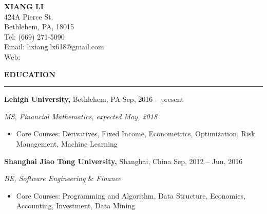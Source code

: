 \documentclass[a4paper,12pt]{report}
\newcommand{\marginAdj}{0.5in}
\begin{document}
\sloppy
{\centering
 \fontsize{12pt}{12pt}\selectfont\textbf{XIANG LI}\\
 \fontsize{11pt}{11pt}\selectfont 424A Pierce St. \\
 \fontsize{11pt}{11pt}\selectfont Bethlehem, PA, 18015 \\
 \fontsize{11pt}{11pt}\selectfont Tel: (669) 271-5090 \\
 \fontsize{11pt}{11pt}\selectfont Email: lixiang.lx618@gmail.com \\
 \fontsize{11pt}{11pt}\selectfont Web: \href{https://github.com/LiXiang618}{} \\
}

\vspace{9pt}



\noindent 
\textbf{EDUCATION} \par
\vspace{2pt}
\hrule
\vspace{6pt}
\noindent 
\textbf{Lehigh University, }Bethlehem, PA{\fontsize{9pt}{9pt}\selectfont \textbf{ \hspace*{3.25in} \hspace*{\marginAdj} }{\fontsize{10pt}{10pt}\selectfont Sep, 2016 – present}} \par
\noindent 
{\fontsize{10pt}{10pt}\selectfont \textit{MS, Financial Mathematics, expected May, 2018}} \par
\noindent 
\begin{itemize}[noitemsep,topsep=0pt]
\item {\fontsize{10pt}{10pt}\selectfont Core Courses: Derivatives, Fixed Income, Econometrics, Optimization, Risk Management, Machine Learning } \par
\end{itemize}
 \par
\noindent 
\textbf{Shanghai Jiao Tong University, }Shanghai, China{\fontsize{9pt}{9pt}\selectfont  \hspace*{2.15in} \hspace*{\marginAdj} {\fontsize{10pt}{10pt}\selectfont Sep, 2012 – Jun, 2016}} \par
\noindent 
{\fontsize{10pt}{10pt}\selectfont \textit{BE, Software Engineering  $  \&  $ Finance}} \par
\noindent 
\begin{itemize}[noitemsep,topsep=0pt]
\item {\fontsize{10pt}{10pt}\selectfont Core Courses: Programming and Algorithm, Data Structure, Economics, Accounting, Investment, Data Mining} \par
\end{itemize}
 \par
 \vspace{9pt}
 
\end{document}
